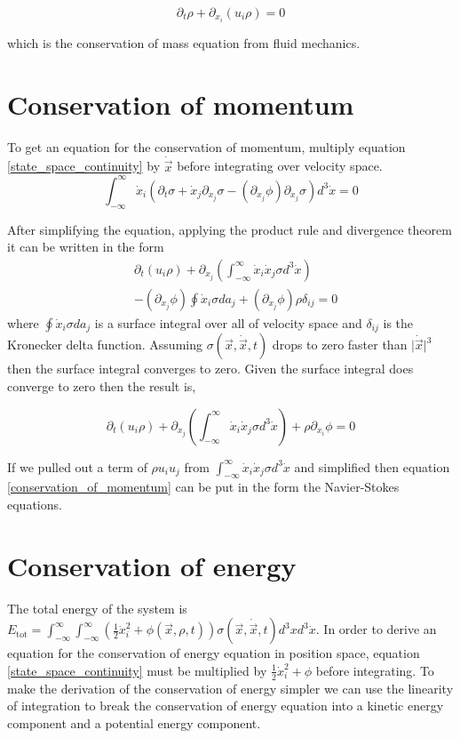 \documentclass[%
 twocolumn,
 preprint, onecolumn,
 amsmath,amssymb,
 aps,
]{revtex4-1}
\newcommand{\dvec}[1]{\dot{\vec{#1}}}
\newcommand{\intVdot}[1]{\int_{-\infty}^{\infty} #1 d^3\dot{x}}
\newcommand{\intVVdot}[1]{\int_{-\infty}^{\infty}\int_{-\infty}^{\infty} #1 d^3xd^3\dot{x}}
\begin{document}
\begin{equation}
\partial_t\rho + \partial_{x_i}\left(u_i\rho\right)=0
\label{conservation_of_mass}
\end{equation}

which is the conservation of mass equation from fluid mechanics.

\section{Conservation of momentum}
To get an equation for the conservation of momentum, multiply equation \eqref{state_space_continuity} by $\dvec{x}$ before integrating over velocity space.
\[
\intVdot{\dot{x}_i\left(\partial_t \sigma + \dot{x}_j\partial_{x_j}\sigma-\left(\partial_{x_j}\phi\right)\partial_{\dot{x}_j}\sigma\right)}=0
\]

After simplifying the equation, applying the product rule and divergence theorem it can be written in the form
\[
\begin{split}
& \partial_t\left(u_i\rho\right) + \partial_{x_j}\left(\intVdot{\dot{x}_i\dot{x}_j\sigma}\right) \\ & - \left(\partial_{x_j}\phi\right)\oint\dot{x}_i\sigma da_j + \left(\partial_{x_j}\phi\right)\rho\delta_{i j}=0
\end{split}
\]
where $\oint\dot{x}_i\sigma da_j$ is a surface integral over all of velocity space and $\delta_{ij}$ is the Kronecker delta function. Assuming $\sigma(\vec{x}, \dvec{x}, t)$ drops to zero faster than $\lvert\dvec{x}\rvert^3$ then the surface integral converges to zero. Given the surface integral does converge to zero then the result is,

\begin{equation}
\partial_t\left(u_i\rho\right) + \partial_{x_j}\left(\intVdot{\dot{x}_i\dot{x}_j\sigma}\right) + \rho\partial_{x_i}\phi=0
\label{conservation_of_momentum}
\end{equation}

If we pulled out a term of $\rho u_i u_j$ from $\intVdot{\dot{x}_i\dot{x}_j\sigma}$ and simplified then equation \eqref{conservation_of_momentum} can be put in the form the Navier-Stokes equations.

\section{Conservation of energy}
The total energy of the system is $E_{\text{tot}}=\intVVdot{\left(\frac{1}{2}\dot{x}_i^2 + \phi(\vec{x}, \rho, t)\right)\sigma(\vec{x}, \dvec{x}, t)}$.  In order to derive an equation for the conservation of energy equation in position space, equation \eqref{state_space_continuity} must be multiplied by $\frac{1}{2}\dot{x}_i^2 + \phi$ before integrating. To make the derivation of the conservation of energy simpler we can use the linearity of integration to break the conservation of energy equation into a kinetic energy component and a potential energy component.
\end{document}
